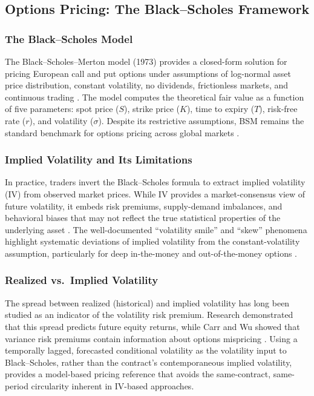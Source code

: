 \documentclass[journal]{IEEEtran}
\begin{document}
\subsection{Options Pricing: The Black--Scholes Framework}

\subsubsection{The Black--Scholes Model}
The Black--Scholes--Merton model (1973) provides a closed-form
solution for pricing European call and put options under assumptions
of log-normal asset price distribution, constant volatility, no
dividends, frictionless markets, and continuous trading
\cite{black1973}. The model computes the theoretical fair value as a
function of five parameters: spot price ($S$), strike price ($K$),
time to expiry ($T$), risk-free rate ($r$), and volatility ($\sigma$).
Despite its restrictive assumptions, BSM remains the standard
benchmark for options pricing across global markets
\cite{hull2022,heston1993}.

\subsubsection{Implied Volatility and Its Limitations}
In practice, traders invert the Black--Scholes formula to extract
implied volatility (IV) from observed market prices. While IV provides
a market-consensus view of future volatility, it embeds risk premiums,
supply-demand imbalances, and behavioral biases that may not reflect
the true statistical properties of the underlying asset
\cite{shreve2004,wilmott2006}. The well-documented ``volatility
smile'' and ``skew'' phenomena highlight systematic deviations of
implied volatility from the constant-volatility assumption,
particularly for deep in-the-money and out-of-the-money options
\cite{heston1993}.

\subsubsection{Realized vs.\ Implied Volatility}
The spread between realized (historical) and implied volatility has
long been studied as an indicator of the volatility risk premium.
Research demonstrated that this spread predicts future equity returns,
while Carr and Wu showed that variance risk premiums contain
information about options mispricing \cite{lu2020,kim2023}. Using a
temporally lagged, forecasted conditional volatility as the volatility
input to Black--Scholes, rather than the contract's contemporaneous
implied volatility, provides a model-based pricing reference that
avoids the same-contract, same-period circularity inherent in
IV-based approaches.
\end{document}
